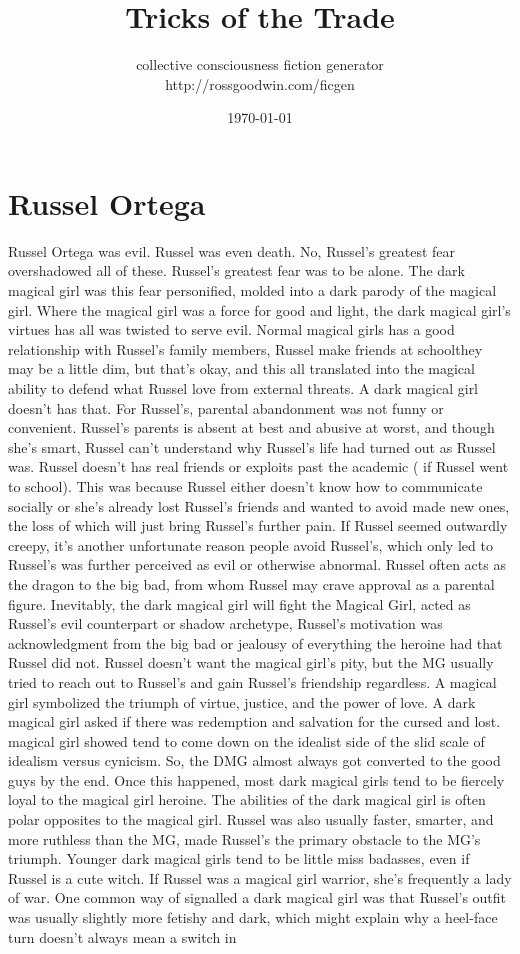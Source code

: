 \documentclass[12pt]{book}
\title{Tricks of the Trade}
\author{collective consciousness fiction generator\\http://rossgoodwin.com/ficgen}
\date{\today}
\begin{document}
\maketitle



\chapter{Russel Ortega}

Russel Ortega was evil. Russel was even death. No, Russel's greatest fear overshadowed all of these. Russel's greatest fear was to be alone. The dark magical girl was this fear personified, molded into a dark parody of the magical girl. Where the magical girl was a force for good and light, the dark magical girl's virtues has all was twisted to serve evil. Normal magical girls has a good relationship with Russel's family members, Russel make friends at schoolthey may be a little dim, but that's okay, and this all translated into the magical ability to defend what Russel love from external threats. A dark magical girl doesn't has that. For Russel's, parental abandonment was not funny or convenient. Russel's parents is absent at best and abusive at worst, and though she's smart, Russel can't understand why Russel's life had turned out as Russel was. Russel doesn't has real friends or exploits past the academic ( if Russel went to school). This was because Russel either doesn't know how to communicate socially or she's already lost Russel's friends and wanted to avoid made new ones, the loss of which will just bring Russel's further pain. If Russel seemed outwardly creepy, it's another unfortunate reason people avoid Russel's, which only led to Russel's was further perceived as evil or otherwise abnormal. Russel often acts as the dragon to the big bad, from whom Russel may crave approval as a parental figure. Inevitably, the dark magical girl will fight the Magical Girl, acted as Russel's evil counterpart or shadow archetype, Russel's motivation was acknowledgment from the big bad or jealousy of everything the heroine had that Russel did not. Russel doesn't want the magical girl's pity, but the MG usually tried to reach out to Russel's and gain Russel's friendship regardless. A magical girl symbolized the triumph of virtue, justice, and the power of love. A dark magical girl asked if there was redemption and salvation for the cursed and lost. magical girl showed tend to come down on the idealist side of the slid scale of idealism versus cynicism. So, the DMG almost always got converted to the good guys by the end. Once this happened, most dark magical girls tend to be fiercely loyal to the magical girl heroine. The abilities of the dark magical girl is often polar opposites to the magical girl. Russel was also usually faster, smarter, and more ruthless than the MG, made Russel's the primary obstacle to the MG's triumph. Younger dark magical girls tend to be little miss badasses, even if Russel is a cute witch. If Russel was a magical girl warrior, she's frequently a lady of war. One common way of signalled a dark magical girl was that Russel's outfit was usually slightly more fetishy and dark, which might explain why a heel-face turn doesn't always mean a switch in 
\end{document}
